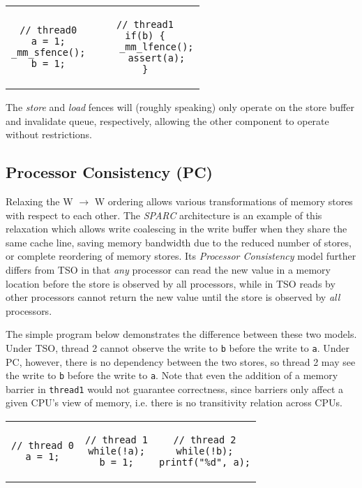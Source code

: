 \begin{center}
    \begin{tabular}{cc}
        \begin{lstlisting}[style=c,showlines=true]
// thread0
a = 1;
_mm_sfence();
b = 1;

        \end{lstlisting}
        &
        \begin{lstlisting}[style=c]
// thread1
if(b) {
    _mm_lfence();
    assert(a);
}
        \end{lstlisting}
    \end{tabular}
\end{center}

The \emph{store} and \emph{load} fences will (roughly speaking) only operate on
the store buffer and invalidate queue, respectively, allowing the other
component to operate without restrictions.

\subsection{Processor Consistency (PC)}

Relaxing the W $\to$ W ordering allows various transformations of memory stores
with respect to each other.  The \textit{SPARC} architecture is an example of
this relaxation which allows write coalescing in the write buffer when they
share the same cache line, saving memory bandwidth due to the reduced number of
stores, or complete reordering of memory stores.  Its \textit{Processor
Consistency} model further differs from TSO in that \emph{any} processor can
read the new value in a memory location before the store is observed by all
processors, while in TSO reads by other processors cannot return the new value
until the store is observed by \emph{all} processors.

The simple program below demonstrates the difference between these two models.
Under TSO, thread 2 cannot observe the write to \texttt{b} before the write to
\texttt{a}.  Under PC, however, there is no dependency between the two stores,
so thread 2 may see the write to \texttt{b} before the write to \texttt{a}.
Note that even the addition of a memory barrier in \texttt{thread1} would not
guarantee correctness, since barriers only affect a given CPU's view of memory,
i.e. there is no transitivity relation across CPUs.

\begin{center}
    \begin{tabular}{ccc}
        \begin{lstlisting}[style=c,showlines=true]
// thread 0
a = 1;

        \end{lstlisting}
        &
        \begin{lstlisting}[style=c]
// thread 1
while(!a);
b = 1;
        \end{lstlisting}
        &
        \begin{lstlisting}[style=c]
// thread 2
while(!b);
printf("%d", a);
        \end{lstlisting}
    \end{tabular}
\end{center}

